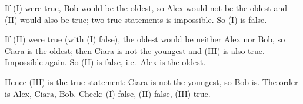 If (I) were true, Bob would be the oldest, so Alex would not be the oldest and (II) would also be true; two true statements is impossible. So (I) is false.

If (II) were true (with (I) false), the oldest would be neither Alex nor Bob, so Ciara is the oldest; then Ciara is not the youngest and (III) is also true. Impossible again. So (II) is false, i.e.\ Alex is the oldest.

Hence (III) is the true statement: Ciara is not the youngest, so Bob is. The order is $\boxed{\text{Alex, Ciara, Bob}}$. Check: (I) false, (II) false, (III) true.
